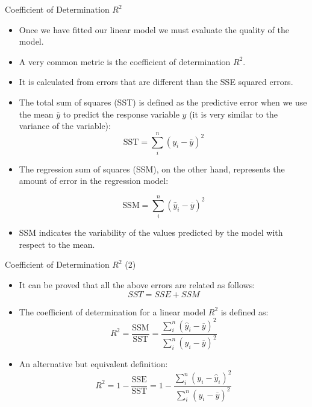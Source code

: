 \documentclass[handout]{beamer}
\begin{document}
\begin{frame}{Coefficient of Determination $R^2$}
\scriptsize{
\begin{itemize}
 \item  Once we have fitted our linear model we must evaluate the quality of the model.
 \item A very common metric is the coefficient of determination $R^2$. 
 \item  It is calculated from errors that are different than the SSE squared errors.
 \item The total sum of squares (SST)  is defined as the predictive error when we use the mean $\overline{y}$  to predict the response variable $y$ (it is very similar to the variance of the variable):
 \begin{displaymath}
  \text{SST} = \sum_{i}^{n}(y_i-\overline{y})^2  
 \end{displaymath}
 \item  The regression sum of squares (SSM), on the other hand, represents the amount of error in the regression model: 

 \begin{displaymath}
  \text{SSM} = \sum_{i}^{n}(\hat{y}_i-\overline{y})^2 
 \end{displaymath}
  
 \item  SSM indicates the variability of the values predicted by the model with respect to the mean. 
 
  
\end{itemize}

}
\end{frame}

\begin{frame}{Coefficient of Determination $R^2$ (2)}
\scriptsize{
\begin{itemize}
 \item It can be proved that all the above errors are related as follows: \begin{equation}
 SST = SSE + SSM                                                 
    \end{equation}


 \item The coefficient of determination for a linear model $R^2$ is defined as:
 \begin{equation}
  R^2= \frac{\text{SSM}}{\text{SST}} = \frac{\sum_{i}^{n}(\hat{y}_i-\overline{y})^2 }{\sum_{i}^{n}(y_i-\overline{y})^2  }
 \end{equation}
 
 \item An alternative but equivalent definition:
  \begin{equation}
  R^2= 1-\frac{\text{SSE}}{\text{SST}} = 1- \frac{\sum_{i}^{n}(y_i-\hat{y}_i)^2 }{\sum_{i}^{n}(y_i-\overline{y})^2  }
  \label{eq:r2}
 \end{equation}
 

  
\end{itemize}


}
\end{frame}
\end{document}
